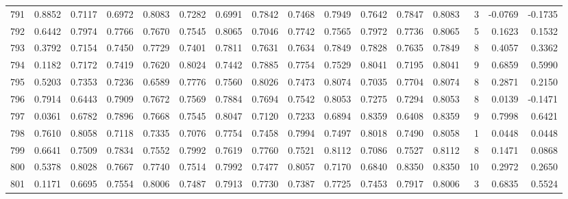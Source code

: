 \begin{tabular}{lrrrrrrrrrrrrrrr}
791 &      0.8852 &  0.7117 &  0.6972 &  0.8083 &  0.7282 &  0.6991 &  0.7842 &  0.7468 &  0.7949 &  0.7642 &   0.7847 &     0.8083 &      3 &                   -0.0769 &                    -0.1735 \\
792 &      0.6442 &  0.7974 &  0.7766 &  0.7670 &  0.7545 &  0.8065 &  0.7046 &  0.7742 &  0.7565 &  0.7972 &   0.7736 &     0.8065 &      5 &                    0.1623 &                     0.1532 \\
793 &      0.3792 &  0.7154 &  0.7450 &  0.7729 &  0.7401 &  0.7811 &  0.7631 &  0.7634 &  0.7849 &  0.7828 &   0.7635 &     0.7849 &      8 &                    0.4057 &                     0.3362 \\
794 &      0.1182 &  0.7172 &  0.7419 &  0.7620 &  0.8024 &  0.7442 &  0.7885 &  0.7754 &  0.7529 &  0.8041 &   0.7195 &     0.8041 &      9 &                    0.6859 &                     0.5990 \\
795 &      0.5203 &  0.7353 &  0.7236 &  0.6589 &  0.7776 &  0.7560 &  0.8026 &  0.7473 &  0.8074 &  0.7035 &   0.7704 &     0.8074 &      8 &                    0.2871 &                     0.2150 \\
796 &      0.7914 &  0.6443 &  0.7909 &  0.7672 &  0.7569 &  0.7884 &  0.7694 &  0.7542 &  0.8053 &  0.7275 &   0.7294 &     0.8053 &      8 &                    0.0139 &                    -0.1471 \\
797 &      0.0361 &  0.6782 &  0.7896 &  0.7668 &  0.7545 &  0.8047 &  0.7120 &  0.7233 &  0.6894 &  0.8359 &   0.6408 &     0.8359 &      9 &                    0.7998 &                     0.6421 \\
798 &      0.7610 &  0.8058 &  0.7118 &  0.7335 &  0.7076 &  0.7754 &  0.7458 &  0.7994 &  0.7497 &  0.8018 &   0.7490 &     0.8058 &      1 &                    0.0448 &                     0.0448 \\
799 &      0.6641 &  0.7509 &  0.7834 &  0.7552 &  0.7992 &  0.7619 &  0.7760 &  0.7521 &  0.8112 &  0.7086 &   0.7527 &     0.8112 &      8 &                    0.1471 &                     0.0868 \\
800 &      0.5378 &  0.8028 &  0.7667 &  0.7740 &  0.7514 &  0.7992 &  0.7477 &  0.8057 &  0.7170 &  0.6840 &   0.8350 &     0.8350 &     10 &                    0.2972 &                     0.2650 \\
801 &      0.1171 &  0.6695 &  0.7554 &  0.8006 &  0.7487 &  0.7913 &  0.7730 &  0.7387 &  0.7725 &  0.7453 &   0.7917 &     0.8006 &      3 &                    0.6835 &                     0.5524 \\

\end{tabular}
